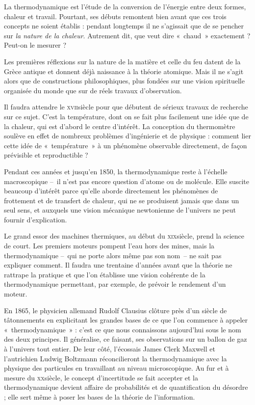 La thermodynamique est l’étude de la conversion de l’énergie entre deux formes, chaleur et travail. Pourtant, ses débuts remontent bien avant que ces trois concepts ne soient établis : pendant longtemps il ne s’agissait que de se pencher sur \emph{la nature de la chaleur}. Autrement dit, que veut dire «~chaud~» exactement ? Peut-on le mesurer ?

Les premières réflexions sur la nature de la matière et celle du feu datent de la Grèce antique et donnent déjà naissance à la théorie atomique. Mais il ne s’agit alors que de constructions philosophiques, plus fondées sur une vision spirituelle organisée du monde que sur de réels travaux d’observation.

Il faudra attendre le \textsc{xvii}\ieme siècle pour que débutent de sérieux travaux de recherche sur ce sujet. C’est la température, dont on se fait plus facilement une idée que de la chaleur, qui est d’abord le centre d’intérêt. La conception du thermomètre soulève en effet de nombreux problèmes d’ingénierie et de physique : comment lier cette idée de «~température~» à un phénomène observable directement, de façon prévisible et reproductible ?

Pendant ces années et jusqu’en 1850, la thermodynamique reste à l’échelle macroscopique –~il n’est pas encore question d’atome ou de molécule. Elle suscite beaucoup d’intérêt parce qu’elle aborde directement les phénomènes de frottement et de transfert de chaleur, qui ne se produisent jamais que dans un seul sens, et auxquels une vision mécanique newtonienne de l’univers ne peut fournir d’explication.

Le grand essor des machines thermiques, au début du \textsc{xix}\ieme siècle, prend la science de court. Les premiers moteurs pompent l’eau hors des mines, mais la thermodynamique –\ qui ne porte alors même pas son nom\ – ne sait pas expliquer comment. Il faudra une trentaine d’années avant que la théorie ne rattrape la pratique et que l’on établisse une vision cohérente de la thermodynamique permettant, par exemple, de prévoir le rendement d’un moteur.

En 1865, le physicien allemand Rudolf Clausius clôture près d’un siècle de tâtonnements en explicitant les grandes bases de ce que l’on commence à appeler «~thermodynamique~» : c’est ce que nous connaissons aujourd’hui sous le nom des deux principes. Il généralise, ce faisant, ses observations sur un ballon de gaz à l’univers tout entier.
De leur côté, l’écossais James Clerk Maxwell et l’autrichien Ludwig Boltzmann réconcilieront la thermodynamique avec la physique des particules en travaillant au niveau microscopique. Au fur et à mesure du \textsc{xx}\ieme siècle, le concept d’incertitude se fait accepter et la thermodynamique devient affaire de probabilités et de quantification du désordre ; elle sert même à poser les bases de la théorie de l’information.

